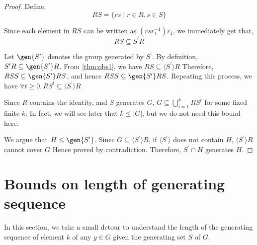 \begin{proof}

Define, 
$$RS = \lbrace rs \mid r \in R, s \in S \rbrace$$

Since each element in $RS$ can be written as $(r s r_1^{-1}) r_1$, we immediately get that,
\begin{equation}
RS \subseteq S^\prime R
\label{thm:obs1}
\end{equation}

Let $\gen{S^\prime}$ denotes the group generated by $S^\prime$. By definition, $S^\prime R \subseteq \gen{S^\prime}R$. From \ref{thm:obs1}, we have $RS \subseteq \langle S^\prime \rangle R$
Therefore, $RSS \subseteq \gen{S^\prime} RS$, and hence $RSS \subseteq \gen{S^\prime} RS$. Repeating this process, we have
$\forall t \geq 0, RS^t \subseteq \langle S^\prime \rangle R$

Since $R$ contains the identity, and $S$ generates $G$, $G \subseteq \bigcup\limits_{i=1}^k RS^t$ for some fixed finite $k$. In fact, we will see later that $k \le |G|$, but we do not need this bound here.

We argue that $H \le \gen{S^\prime}$. Sinec $G \subseteq \langle S^\prime \rangle R$, if $\langle S^\prime \rangle$ does not contain $H$, $\langle S^\prime \rangle R $ cannot cover $G$ Hence proved by contradiction. Therefore, $S^\prime \cap H$ generates $H$.
\end{proof}




\section{Bounds on length of generating sequence}
In this section, we take a small detour to 
understand the length of the generating sequence of
element $k$ of any $g \in G$ given the generating set $S$ of $G$.

